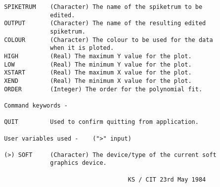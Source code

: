 \begin{description}
\begin{verbatim}
 SPIKETRUM    (Character) The name of the spiketrum to be
              edited.
 OUTPUT       (Character) The name of the resulting edited
              spiketrum.
 COLOUR       (Character) The colour to be used for the data
              when it is ploted.
 HIGH         (Real) The maximum Y value for the plot.
 LOW          (Real) The minimum Y value for the plot.
 XSTART       (Real) The maximum X value for the plot.
 XEND         (Real) The minimum X value for the plot.
 ORDER        (Integer) The order for the polynomial fit.

 Command keywords -

 QUIT         Used to confirm quitting from application.

 User variables used -    (">" input)

 (>) SOFT     (Character) The device/type of the current soft
              graphics device.

                                    KS / CIT 23rd May 1984
\end{verbatim}
\end{description}
